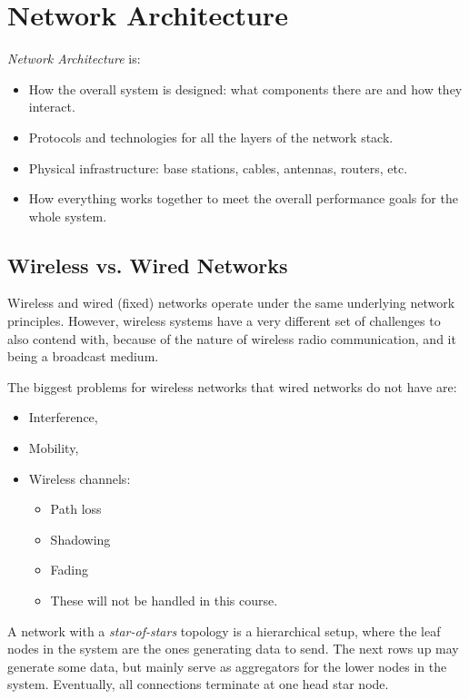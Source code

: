\section{Network Architecture}\label{sec:Network_Architecture}
\begin{definition}\label{def:Network_Architecture}
  \emph{Network Architecture} is:
  \begin{itemize}[noitemsep]
  \item How the overall system is designed: what components there are and how they interact.
  \item Protocols and technologies for all the layers of the network stack.
  \item Physical infrastructure: base stations, cables, antennas, routers, etc.
  \item How everything works together to meet the overall performance goals for the whole system.
  \end{itemize}
\end{definition}

\subsection{Wireless vs. Wired Networks}\label{subsec:Wireless_vs_Wired}
Wireless and wired (fixed) networks operate under the same underlying network principles.
However, wireless systems have a very different set of challenges to also contend with, because of the nature of wireless radio communication, and it being a broadcast medium.

The biggest problems for wireless networks that wired networks do not have are:
\begin{itemize}[noitemsep]
\item Interference, 
\item Mobility, 
\item Wireless channels:
  \begin{itemize}[noitemsep]
  \item Path loss
  \item Shadowing
  \item Fading
  \item These will not be handled in this course.
  \end{itemize}
\end{itemize}

\begin{definition}\label{def:Star_of_Stars}
  A network with a \emph{star-of-stars} topology is a hierarchical setup, where the leaf nodes in the system are the ones generating data to send.
  The next rows up may generate some data, but mainly serve as aggregators for the lower nodes in the system.
  Eventually, all connections terminate at one head star node.
\end{definition}

